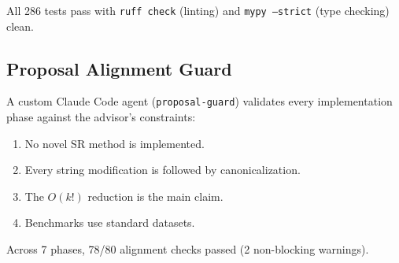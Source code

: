 All 286 tests pass with \texttt{ruff check} (linting) and
\texttt{mypy --strict} (type checking) clean.

\subsection{Proposal Alignment Guard}

A custom Claude Code agent (\texttt{proposal-guard}) validates every
implementation phase against the advisor's constraints:
\begin{enumerate}[nosep]
  \item No novel SR method is implemented.
  \item Every string modification is followed by canonicalization.
  \item The $O(k!)$ reduction is the main claim.
  \item Benchmarks use standard datasets.
\end{enumerate}
Across 7 phases, 78/80 alignment checks passed (2 non-blocking warnings).
